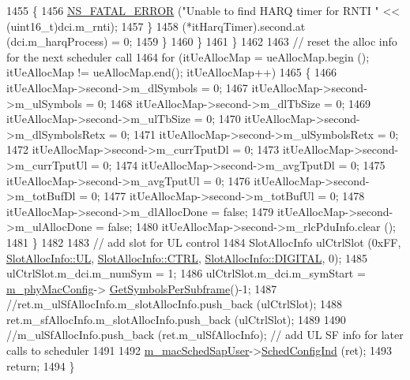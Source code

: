 \begin{DoxyCode}
1455                                 \{
1456                                         \hyperlink{group__fatal_ga5131d5e3f75d7d4cbfd706ac456fdc85}{NS\_FATAL\_ERROR} (\textcolor{stringliteral}{"Unable to find HARQ timer for RNTI "}
       << (uint16\_t)dci.m\_rnti);
1457                                 \}
1458                                 (*itHarqTimer).second.at (dci.m\_harqProcess) = 0;
1459                         \}
1460                 \}
1461         \}
1462 
1463         \textcolor{comment}{// reset the alloc info for the next scheduler call}
1464         \textcolor{keywordflow}{for} (itUeAllocMap = ueAllocMap.begin (); itUeAllocMap != ueAllocMap.end(); itUeAllocMap++)
1465         \{
1466                 itUeAllocMap->second->m\_dlSymbols = 0;
1467                 itUeAllocMap->second->m\_ulSymbols = 0;
1468                 itUeAllocMap->second->m\_dlTbSize = 0;
1469                 itUeAllocMap->second->m\_ulTbSize = 0;
1470                 itUeAllocMap->second->m\_dlSymbolsRetx = 0;
1471                 itUeAllocMap->second->m\_ulSymbolsRetx = 0;
1472                 itUeAllocMap->second->m\_currTputDl = 0;
1473                 itUeAllocMap->second->m\_currTputUl = 0;
1474                 itUeAllocMap->second->m\_avgTputDl = 0;
1475                 itUeAllocMap->second->m\_avgTputUl = 0;
1476                 itUeAllocMap->second->m\_totBufDl = 0;
1477                 itUeAllocMap->second->m\_totBufUl = 0;
1478                 itUeAllocMap->second->m\_dlAllocDone = \textcolor{keyword}{false};
1479                 itUeAllocMap->second->m\_ulAllocDone = \textcolor{keyword}{false};
1480                 itUeAllocMap->second->m\_rlcPduInfo.clear ();
1481         \}
1482 
1483         \textcolor{comment}{// add slot for UL control}
1484         SlotAllocInfo ulCtrlSlot (0xFF, \hyperlink{structns3_1_1SlotAllocInfo_a6cad60db1d39034f1851e2cea625fe5da916b5be54594ead6ed677c570311cad2}{SlotAllocInfo::UL}, 
      \hyperlink{structns3_1_1SlotAllocInfo_a3ea7cb503bfd0c9a4df55a71b81b9331ad78b7d76ef82d56c33be1fa9c1867409}{SlotAllocInfo::CTRL}, \hyperlink{structns3_1_1SlotAllocInfo_adcbd067d82be6260b3399167d8f0b4eca47a67c342db658a08ded9ce4b49417ea}{SlotAllocInfo::DIGITAL}, 0);
1485         ulCtrlSlot.m\_dci.m\_numSym = 1;
1486         ulCtrlSlot.m\_dci.m\_symStart = \hyperlink{classns3_1_1MmWaveMacScheduler_a24d7af4971d2e500fe543cefbafa2fd9}{m\_phyMacConfig}->
      \hyperlink{classns3_1_1MmWavePhyMacCommon_a2fe835b76e3c689defa413e395cd10cb}{GetSymbolsPerSubframe}()-1;
1487         \textcolor{comment}{//ret.m\_ulSfAllocInfo.m\_slotAllocInfo.push\_back (ulCtrlSlot);}
1488         ret.m\_sfAllocInfo.m\_slotAllocInfo.push\_back (ulCtrlSlot);
1489 
1490         \textcolor{comment}{//m\_ulSfAllocInfo.push\_back (ret.m\_ulSfAllocInfo); // add UL SF info for later calls to scheduler}
1491 
1492         \hyperlink{classns3_1_1MmWaveFlexTtiMaxRateMacScheduler_a5cbf24eeaf560ea4a132bf967e80f817}{m\_macSchedSapUser}->\hyperlink{classns3_1_1MmWaveMacSchedSapUser_ac164dd52215c3924cf421b56089eece4}{SchedConfigInd} (ret);
1493         \textcolor{keywordflow}{return};
1494 \}
\end{DoxyCode}


